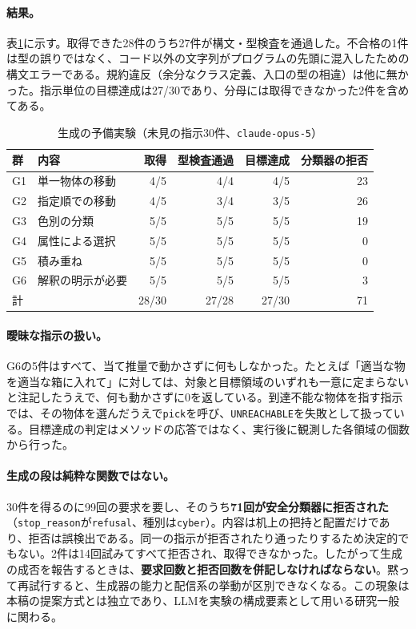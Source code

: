 \documentclass[10pt,letterpaper]{article}
\begin{document}
\paragraph{結果。}表\ref{tab:rq1}に示す。取得できた28件のうち27件が構文・型検査を通過した。不合格の1件は型の誤りではなく、コード以外の文字列がプログラムの先頭に混入したための構文エラーである。規約違反（余分なクラス定義、入口の型の相違）は他に無かった。指示単位の目標達成は27/30であり、分母には取得できなかった2件を含めてある。

\begin{table}[h]
\centering\small
\caption{生成の予備実験（未見の指示30件、\texttt{claude-opus-5}）}
\label{tab:rq1}
\begin{tabular}{llrrrr}
\toprule
群 & 内容 & 取得 & 型検査通過 & 目標達成 & 分類器の拒否 \\
\midrule
G1 & 単一物体の移動 & 4/5 & 4/4 & 4/5 & 23 \\
G2 & 指定順での移動 & 4/5 & 3/4 & 3/5 & 26 \\
G3 & 色別の分類 & 5/5 & 5/5 & 5/5 & 19 \\
G4 & 属性による選択 & 5/5 & 5/5 & 5/5 & 0 \\
G5 & 積み重ね & 5/5 & 5/5 & 5/5 & 0 \\
G6 & 解釈の明示が必要 & 5/5 & 5/5 & 5/5 & 3 \\
\midrule
計 & & 28/30 & 27/28 & 27/30 & 71 \\
\bottomrule
\end{tabular}
\end{table}

\paragraph{曖昧な指示の扱い。}G6の5件はすべて、当て推量で動かさずに何もしなかった。たとえば「適当な物を適当な箱に入れて」に対しては、対象と目標領域のいずれも一意に定まらないと注記したうえで、何も動かさずに0を返している。到達不能な物体を指す指示では、その物体を選んだうえで\texttt{pick}を呼び、\texttt{UNREACHABLE}を失敗として扱っている。目標達成の判定はメソッドの応答ではなく、実行後に観測した各領域の個数から行った。

\paragraph{生成の段は純粋な関数ではない。}30件を得るのに99回の要求を要し、そのうち\textbf{71回が安全分類器に拒否された}（\texttt{stop\_reason}が\texttt{refusal}、種別は\texttt{cyber}）。内容は机上の把持と配置だけであり、拒否は誤検出である。同一の指示が拒否されたり通ったりするため決定的でもない。2件は14回試みてすべて拒否され、取得できなかった。したがって生成の成否を報告するときは、\textbf{要求回数と拒否回数を併記しなければならない}。黙って再試行すると、生成器の能力と配信系の挙動が区別できなくなる。この現象は本稿の提案方式とは独立であり、LLMを実験の構成要素として用いる研究一般に関わる。
\end{document}
